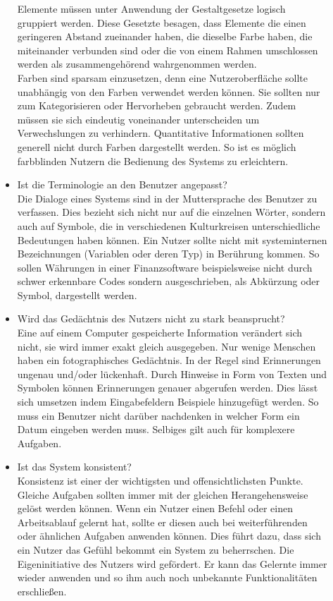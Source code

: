 \begin{description}
\begin{itemize}
Elemente müssen unter Anwendung der Gestaltgesetze logisch gruppiert werden. Diese Gesetzte besagen, dass Elemente die 
einen geringeren Abstand zueinander haben, die dieselbe Farbe haben, die miteinander verbunden sind oder die von einem Rahmen umschlossen werden als zusammengehörend wahrgenommen werden. \\
Farben sind sparsam einzusetzen, denn eine Nutzeroberfläche sollte unabhängig von den Farben verwendet werden können. Sie sollten nur zum  Kategorisieren oder Hervorheben gebraucht werden. Zudem müssen sie sich eindeutig voneinander unterscheiden um Verwechslungen zu verhindern. Quantitative Informationen sollten generell nicht durch Farben dargestellt werden. So ist es möglich farbblinden Nutzern die Bedienung des Systems zu erleichtern.\cite[S. 115 ff.]{Nielsen:1994vk} %

\item Ist die Terminologie an den Benutzer angepasst? \\
Die Dialoge eines Systems sind in der Muttersprache des Benutzer zu verfassen. Dies bezieht sich nicht nur auf die einzelnen Wörter, sondern auch auf Symbole, die in verschiedenen Kulturkreisen unterschiedliche Bedeutungen haben können. Ein Nutzer sollte nicht mit systeminternen Bezeichnungen (Variablen oder deren Typ) in Berührung kommen. So sollen Währungen in einer Finanzsoftware beispielsweise nicht durch schwer erkennbare Codes sondern ausgeschrieben, als Abkürzung oder Symbol, dargestellt werden. \cite[S. 123 ff.]{Nielsen:1994vk}

\item Wird das Gedächtnis des Nutzers nicht zu stark beansprucht?\\
Eine auf einem Computer gespeicherte Information verändert sich nicht, sie wird immer exakt gleich ausgegeben. Nur wenige Menschen haben ein fotographisches Gedächtnis. In der Regel sind Erinnerungen ungenau und/oder lückenhaft. Durch Hinweise in Form von  Texten und Symbolen können Erinnerungen genauer abgerufen werden. Dies lässt sich umsetzen indem Eingabefeldern Beispiele hinzugefügt werden. So muss ein Benutzer nicht darüber nachdenken in welcher Form ein Datum eingeben werden muss. Selbiges gilt auch für komplexere Aufgaben. \cite[S. 129 ff.]{Nielsen:1994vk}

\item Ist das System konsistent? \\
Konsistenz ist einer der wichtigsten und offensichtlichsten Punkte. Gleiche Aufgaben sollten immer mit der gleichen Herangehensweise gelöst werden können. Wenn ein Nutzer einen Befehl oder einen Arbeitsablauf gelernt hat, sollte er diesen auch bei weiterführenden oder ähnlichen Aufgaben anwenden können. Dies führt dazu, dass sich ein Nutzer das Gefühl bekommt ein System zu beherrschen. Die Eigeninitiative des Nutzers wird gefördert. Er kann das Gelernte immer wieder anwenden und so ihm auch noch unbekannte Funktionalitäten erschließen. \cite[S. 132 f.]{Nielsen:1994vk}


\end{itemize}
\end{description}
